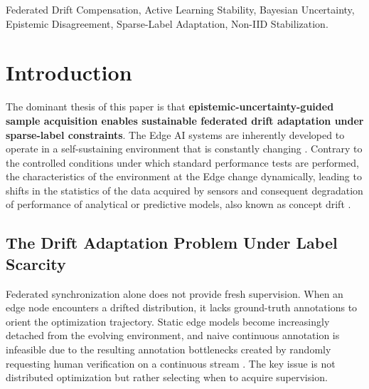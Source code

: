 \documentclass[conference]{IEEEtran}
\begin{document}
\begin{IEEEkeywords}
Federated Drift Compensation, Active Learning Stability, Bayesian Uncertainty, Epistemic Disagreement, Sparse-Label Adaptation, Non-IID Stabilization.
\end{IEEEkeywords}

\section{Introduction}

The dominant thesis of this paper is that \textbf{epistemic-uncertainty-guided sample acquisition enables sustainable federated drift adaptation under sparse-label constraints}. The Edge AI systems are inherently developed to operate in a self-sustaining environment that is constantly changing \cite{b1}. Contrary to the controlled conditions under which standard performance tests are performed, the characteristics of the environment at the Edge change dynamically, leading to shifts in the statistics of the data acquired by sensors and consequent degradation of performance of analytical or predictive models, also known as concept drift \cite{b28}.

\subsection{The Drift Adaptation Problem Under Label Scarcity}
Federated synchronization alone does not provide fresh supervision. When an edge node encounters a drifted distribution, it lacks ground-truth annotations to orient the optimization trajectory. Static edge models become increasingly detached from the evolving environment, and naive continuous annotation is infeasible due to the resulting annotation bottlenecks created by randomly requesting human verification on a continuous stream \cite{b19}. The key issue is not distributed optimization but rather selecting when to acquire supervision.
\end{document}
